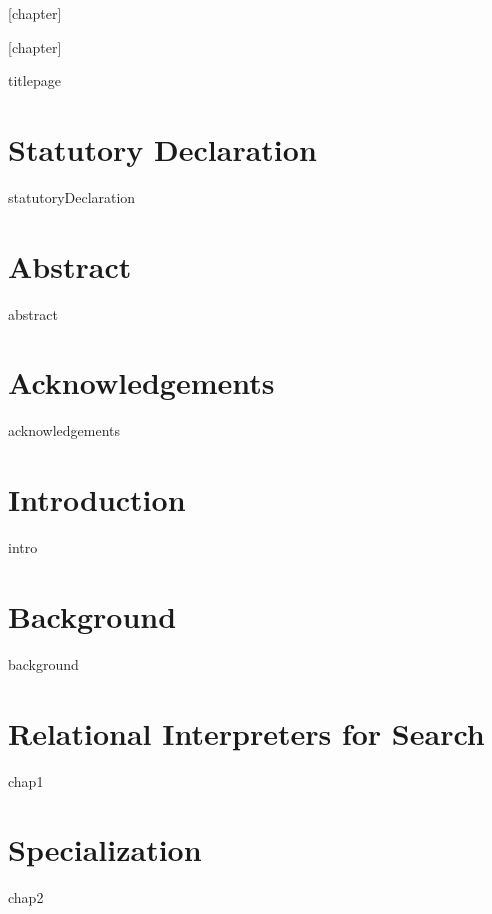 \documentclass{book}
\begin{document}
[chapter]

[chapter]

\frontmatter
{titlepage}

\linespread{1.2}\selectfont

\chapter*{Statutory Declaration}
{statutoryDeclaration}

\chapter*{Abstract}
{abstract}

\chapter*{Acknowledgements}
{acknowledgements}

\dominitoc
\tableofcontents


\mainmatter

\chapter{Introduction}\label{chap:intro}
\minitoc
{intro}

\chapter{Background}\label{chap:background}
\minitoc
{background}

\chapter{Relational Interpreters for Search}\label{chap:1}
\minitoc
{chap1}

\chapter{Specialization}\label{chap:2}
\minitoc
{chap2}
\end{document}
